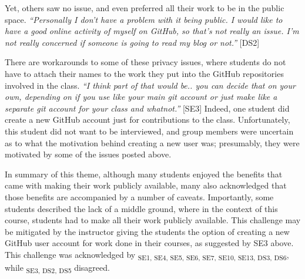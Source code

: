 
Yet, others saw no issue, and even preferred all their work to be in the public space. \textit{``Personally I don't have a problem with it being public. I would like to have a good online activity of myself on GitHub, so that's not really an issue. I'm not really concerned if someone is going to read my blog or not.''} [DS2]

There are workarounds to some of these privacy issues, where students do not have to attach their names to the work they put into the GitHub repositories involved in the class. \textit{``I think part of that would be.. you can decide that on your own, depending on if you use like your main git account or just make like a separate git account for your class and whatnot.''} [SE3] Indeed, one student did create a new GitHub account just for contributions to the class. Unfortunately, this student did not want to be interviewed, and group members were uncertain as to what the motivation behind creating a new user was; presumably, they were motivated by some of the issues posted above.

In summary of this theme, although many students enjoyed the benefits that came with making their work publicly available, many also acknowledged that those benefits are accompanied by a number of caveats. Importantly, some students described the lack of a middle ground, where in the context of this course, students had to make all their work publicly available. This challenge may be mitigated by the instructor giving the students the option of creating a new GitHub user account for work done in their courses, as suggested by SE3 above. This challenge was acknowledged by \textsubscript{SE1, SE4, SE5, SE6, SE7, SE10, SE13, DS3, DS6}, while \textsubscript{SE3, DS2, DS5} disagreed.


